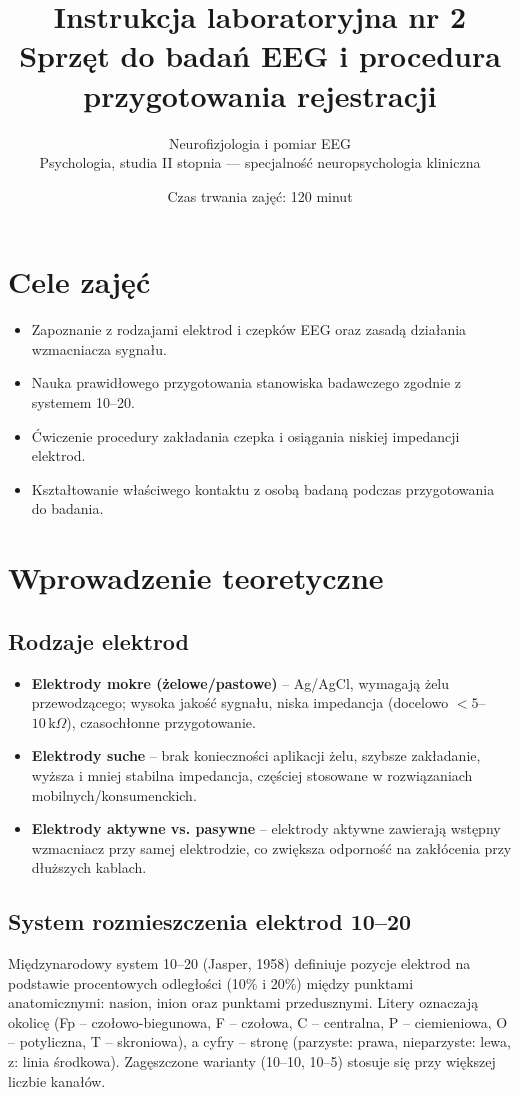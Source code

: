 \documentclass[11pt,a4paper]{article}
\title{\vspace{-1.5cm}\textbf{\color{navy}Instrukcja laboratoryjna nr 2}\\[4pt]
\Large Sprzęt do badań EEG i procedura przygotowania rejestracji}
\author{Neurofizjologia i pomiar EEG\\ Psychologia, studia II stopnia --- specjalność neuropsychologia kliniczna}
\date{Czas trwania zajęć: 120 minut}
\begin{document}
\maketitle
\thispagestyle{fancy}

\section{Cele zajęć}
\begin{itemize}[nosep]
  \item Zapoznanie z rodzajami elektrod i czepków EEG oraz zasadą działania wzmacniacza sygnału.
  \item Nauka prawidłowego przygotowania stanowiska badawczego zgodnie z systemem 10--20.
  \item Ćwiczenie procedury zakładania czepka i osiągania niskiej impedancji elektrod.
  \item Kształtowanie właściwego kontaktu z osobą badaną podczas przygotowania do badania.
\end{itemize}

\section{Wprowadzenie teoretyczne}

\subsection{Rodzaje elektrod}
\begin{itemize}[nosep]
  \item \textbf{Elektrody mokre (żelowe/pastowe)} -- Ag/AgCl, wymagają żelu przewodzącego; wysoka jakość sygnału, niska impedancja (docelowo $<5$--$10\,\text{k}\Omega$), czasochłonne przygotowanie.
  \item \textbf{Elektrody suche} -- brak konieczności aplikacji żelu, szybsze zakładanie, wyższa i mniej stabilna impedancja, częściej stosowane w rozwiązaniach mobilnych/konsumenckich.
  \item \textbf{Elektrody aktywne vs. pasywne} -- elektrody aktywne zawierają wstępny wzmacniacz przy samej elektrodzie, co zwiększa odporność na zakłócenia przy dłuższych kablach.
\end{itemize}

\subsection{System rozmieszczenia elektrod 10--20}
Międzynarodowy system 10--20 (Jasper, 1958) definiuje pozycje elektrod na podstawie procentowych odległości (10\% i 20\%) między punktami anatomicznymi: nasion, inion oraz punktami przedusznymi. Litery oznaczają okolicę (Fp -- czołowo-biegunowa, F -- czołowa, C -- centralna, P -- ciemieniowa, O -- potyliczna, T -- skroniowa), a cyfry -- stronę (parzyste: prawa, nieparzyste: lewa, z: linia środkowa). Zagęszczone warianty (10--10, 10--5) stosuje się przy większej liczbie kanałów.
\end{document}
